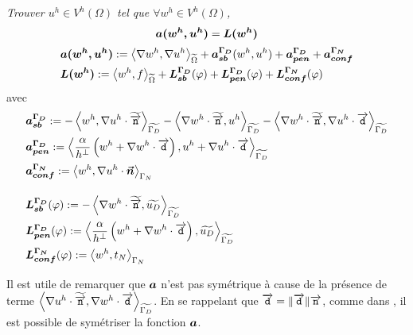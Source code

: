\begin{refe}
	\textit{Trouver $u^h\in V^h (\Omega)$ tel que $\forall w^h \in V^h (\Omega)$,}
	\begin{equation}
		\boldsymbol{a(w^h, u^h)} = \boldsymbol{L(w^h)}
	\end{equation}
	\begin{align*}
	&\boldsymbol{a(w^h, u^h)} := \left<\nabla w^h,\nabla u^h\right>_{\widetilde{\Omega}} + \boldsymbol{a_{sb}^{\Gamma_{D}}}(w^h, u^h) + \boldsymbol{a_{pen}^{\Gamma_{D}}} + \boldsymbol{a_{conf}^{\Gamma_{N}}}\\
	&\boldsymbol{L(w^h)} := \left<w^h,f\right>_{\widetilde{\Omega}} + \boldsymbol{L_{sb}^{\Gamma_{D}}} (\varphi) + \boldsymbol{L_{pen}^{\Gamma_{D}}} (\varphi)  + \boldsymbol{L_{conf}^{\Gamma_{N}}} (\varphi) 
	\end{align*}
	avec 
	\begin{align*}
		&\boldsymbol{a_{sb}^{\Gamma_{D}}} := -\left<w^h,\nabla u^h \cdot \widetilde{\overrightarrow{\boldsymbol{\mathtt{n}}}}\right>_{\widetilde{\Gamma_D}} - \left<\nabla w^h \cdot \widetilde{\overrightarrow{\boldsymbol{\mathtt{n}}}},u^h\right>_{\widetilde{\Gamma_D}} -  \left<\nabla w^h \cdot \widetilde{\overrightarrow{\boldsymbol{\mathtt{n}}}},\nabla u^h \cdot \overrightarrow{\boldsymbol{\mathtt{d}}}\right>_{\widetilde{\Gamma_D}}\\
		&\boldsymbol{a_{pen}^{\Gamma_{D}}} := \left<\frac{\alpha}{h^{\perp}} \left(w^h + \nabla w^h \cdot \overrightarrow{\boldsymbol{\mathtt{d}}}\right),u^h + \nabla u^h \cdot \overrightarrow{\boldsymbol{\mathtt{d}}}\right>_{\widetilde{\Gamma_D}}\\
		&\boldsymbol{a_{conf}^{\Gamma_{N}}} :=\left<w^h,\nabla u^h \cdot \boldsymbol{\vec{n}}\right>_{\Gamma_N}\\[1em]
		&\boldsymbol{L_{sb}^{\Gamma_{D}}} (\varphi) := - \left<\nabla w^h \cdot \widetilde{\overrightarrow{\boldsymbol{\mathtt{n}}}},\widetilde{u_D}\right>_{\widetilde{\Gamma_D}}\\
		&\boldsymbol{L_{pen}^{\Gamma_{D}}} (\varphi) := \left<\frac{\alpha}{h^{\perp}} \left(w^h + \nabla w^h \cdot \overrightarrow{\boldsymbol{\mathtt{d}}}\right), \widetilde{u_D}\right>_{\widetilde{\Gamma_D}}\\
		&\boldsymbol{L_{conf}^{\Gamma_{N}}} (\varphi) := \left<w^h,t_N\right>_{\Gamma_N}
	\end{align*}
\end{refe}
Il est utile de remarquer que $\boldsymbol{a}$ n'est pas symétrique à cause de la présence de terme $\left<\nabla u^h \cdot \widetilde{\overrightarrow{\boldsymbol{\mathtt{n}}}},\nabla w^h \cdot \overrightarrow{\boldsymbol{\mathtt{d}}}\right>_{\widetilde{\Gamma_D}}$. En se rappelant que $\overrightarrow{\boldsymbol{\mathtt{d}}} = \| \overrightarrow{\boldsymbol{\mathtt{d}}}\|\overrightarrow{\boldsymbol{\mathtt{n}}}$, comme dans \citet{main_shifted_2018}, il est possible de symétriser la fonction $\boldsymbol{a}$.
